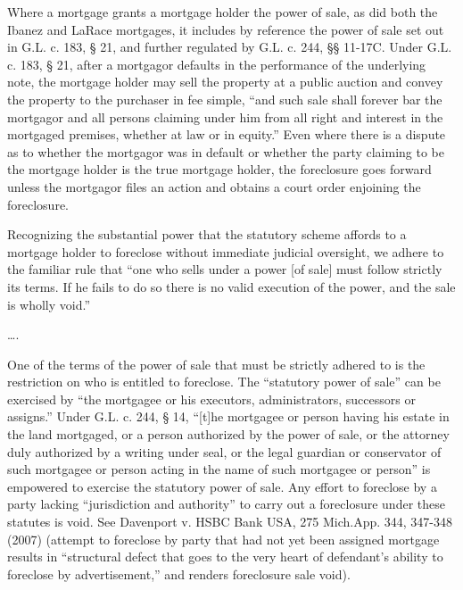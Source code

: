 Where a mortgage grants a mortgage holder the power of sale, as did both the
Ibanez and LaRace mortgages, it includes by reference the power of sale set out
in G.L. c. 183, {\S} 21, and further regulated by G.L. c. 244, {\S}{\S} 11-17C.
Under G.L. c. 183, {\S} 21, after a mortgagor defaults in the performance of
the underlying note, the mortgage holder may sell the property at a public
auction and convey the property to the purchaser in fee simple, ``and such sale
shall forever bar the mortgagor and all persons claiming under him from all
right and interest in the mortgaged premises, whether at law or in equity.''
Even where there is a dispute as to whether the mortgagor was in default or
whether the party claiming to be the mortgage holder is the true mortgage
holder, the foreclosure goes forward unless the mortgagor files an action and
obtains a court order enjoining the foreclosure. 

Recognizing the substantial power that the statutory scheme affords to a
mortgage holder to foreclose without immediate judicial oversight, we adhere to
the familiar rule that ``one who sells under a power [of sale] must follow
strictly its terms. If he fails to do so there is no valid execution of the
power, and the sale is wholly void.''

\dots.

One of the terms of the power of sale that must be strictly adhered to is the
restriction on who is entitled to foreclose. The ``statutory power of sale''
can be exercised by ``the mortgagee or his executors, administrators,
successors or assigns.'' Under G.L. c. 244, {\S} 14, ``[t]he mortgagee or
person having his estate in the land mortgaged, or a person authorized by the
power of sale, or the attorney duly authorized by a writing under seal, or the
legal guardian or conservator of such mortgagee or person acting in the name of
such mortgagee or person'' is empowered to exercise the statutory power of
sale. Any effort to foreclose by a party lacking ``jurisdiction and authority''
to carry out a foreclosure under these statutes is void. See Davenport v. HSBC
Bank USA, 275 Mich.App. 344, 347-348 (2007) (attempt to foreclose by party that
had not yet been assigned mortgage results in ``structural defect that goes to
the very heart of defendant's ability to foreclose by advertisement,'' and
renders foreclosure sale void).

